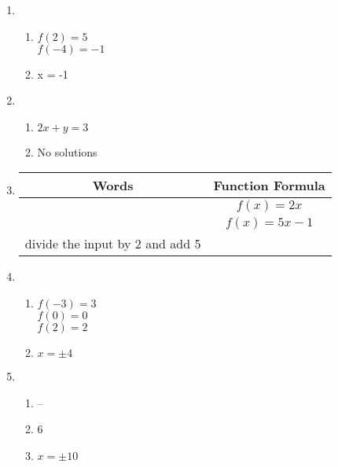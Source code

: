 \documentclass{article}
\begin{document}
\begin{enumerate}
\item

	\begin{enumerate}
	
	\item $f(2) = 5$ \\
		$f(-4) = -1$
	
	\item x = -1
	
	\end{enumerate}
	
\item

	\begin{enumerate}
	
	\item $2x + y = 3$
	
	\item No solutions
	
	\end{enumerate}
	
\item 

	\begin{tabular}{ c | c }
	Words & Function Formula \\
	\hline
	& $f(x) = 2x$ \\
	\hline
	& $f(x) = 5x - 1$ \\
	\hline
	divide the input by 2 and add 5 &
	\end{tabular}
	
\item

	\begin{enumerate}
	
	\item $f(-3) = 3$ \\
		$f(0) = 0$ \\
		$f(2) = 2$
		
	\item $x = \pm 4$
	
	\end{enumerate}
	
\item

	\begin{enumerate}
	
	\item --
	
	\item 6
	
	\item $x = \pm 10$
	

\end{enumerate}
\end{enumerate}
\end{document}
